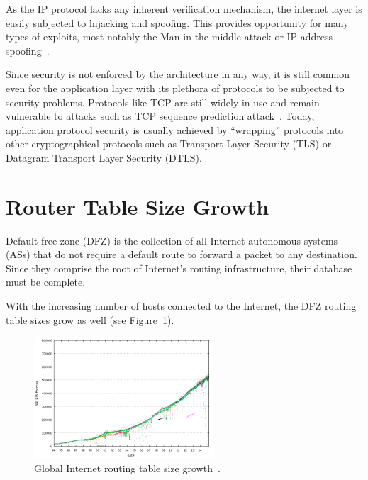         As the IP protocol lacks any inherent verification mechanism, the internet layer is easily subjected to hijacking and spoofing. This provides opportunity for many types of exploits, most notably the Man-in-the-middle attack or IP address spoofing~\cite{rfc1948}.

        Since security is not enforced by the architecture in any way, it is still common even for the application layer with its plethora of protocols to be subjected to security problems. Protocols like TCP are still widely in use and remain vulnerable to attacks such as TCP sequence prediction attack~\cite{rfc1948}. Today, application protocol security is usually achieved by ``wrapping'' protocols into other cryptographical protocols such as Transport Layer Security (TLS) or Datagram Transport Layer Security (DTLS).

    \section{Router Table Size Growth}

        Default-free zone (DFZ) is the collection of all Internet autonomous systems (ASs) that do not require a default route to forward a packet to any destination. Since they comprise the root of Internet's routing infrastructure, their database must be complete.

        With the increasing number of hosts connected to the Internet, the DFZ routing table sizes grow as well (see Figure~\ref{fig:bgp-growth}).

        \begin{figure}[H]
            \begin{center}
                \includegraphics[width=0.6\textwidth]{fig/problems_bgp-growth.png}
              \caption{Global Internet routing table size growth~\cite{bgpgrow}.}
              \label{fig:bgp-growth}
            \end{center}
        \end{figure}

